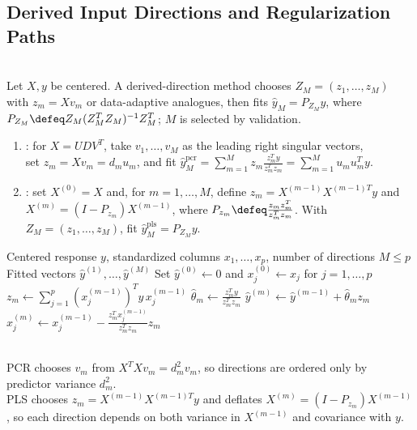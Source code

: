 \subsection{Derived Input Directions and Regularization Paths}
\begin{method} \label{meth:sl-derived-input-directions} \\
Let $X,y$ be centered. A derived-direction method chooses $Z_M=(z_1,\ldots,z_M)$ with $z_m=Xv_m$ or data-adaptive analogues, then fits $\widehat{y}_M=P_{Z_M}y$, where $P_{Z_M}\defeq Z_M(Z_M^TZ_M)^{-1}Z_M^T$; $M$ is selected by validation.
\begin{enumerate}[label=(\roman*)]
\setlength{\itemsep}{0pt}
\item {}: for $X=UDV^T$, take $v_1,\ldots,v_M$ as the leading right singular vectors,\\
set $z_m=Xv_m=d_mu_m$, and fit $\widehat{y}^{\mathrm{pcr}}_M=\sum\limits_{m=1}^M z_m\frac{z_m^Ty}{z_m^Tz_m}=\sum\limits_{m=1}^M u_mu_m^Ty$.
\item {}: set $X^{(0)}=X$ and, for $m=1,\ldots,M$, define $z_m=X^{(m-1)}X^{(m-1)T}y$ and\\
$X^{(m)}=(I-P_{z_m})X^{(m-1)}$, where $P_{z_m}\defeq \frac{z_mz_m^T}{z_m^Tz_m}$. With $Z_M=(z_1,\ldots,z_M)$, fit $\widehat{y}^{\mathrm{pls}}_M=P_{Z_M}y$.
\end{enumerate}
\end{method}

\begin{breakablealgorithm}
\caption{Partial Least Squares Directions}
\label{alg:sl-partial-least-squares-directions}
\begin{algorithmic}
\Require Centered response $y$, standardized columns $x_1,\ldots,x_p$, number of directions $M\leq p$
\Ensure Fitted vectors $\widehat{y}^{(1)},\ldots,\widehat{y}^{(M)}$
\State Set $\widehat{y}^{(0)}\gets0$ and $x_j^{(0)}\gets x_j$ for $j=1,\ldots,p$
\State $z_m\gets\sum\limits_{j=1}^p (x_j^{(m-1)})^Ty\,x_j^{(m-1)}$
\State $\widehat{\theta}_m\gets \frac{z_m^Ty}{z_m^Tz_m}$
\State $\widehat{y}^{(m)}\gets\widehat{y}^{(m-1)}+\widehat{\theta}_m z_m$
\State $x_j^{(m)}\gets x_j^{(m-1)}-\frac{z_m^Tx_j^{(m-1)}}{z_m^Tz_m}z_m$
\EndFor
\EndFor
\end{algorithmic}
\end{breakablealgorithm}

\begin{remark} \label{rem:sl-pls-pcr-contrast} \\
PCR chooses $v_m$ from $X^TXv_m=d_m^2v_m$, so directions are ordered only by predictor variance $d_m^2$.\\
PLS chooses $z_m=X^{(m-1)}X^{(m-1)T}y$ and deflates $X^{(m)}=(I-P_{z_m})X^{(m-1)}$, so each direction depends on both variance in $X^{(m-1)}$ and covariance with $y$.
\end{remark}

